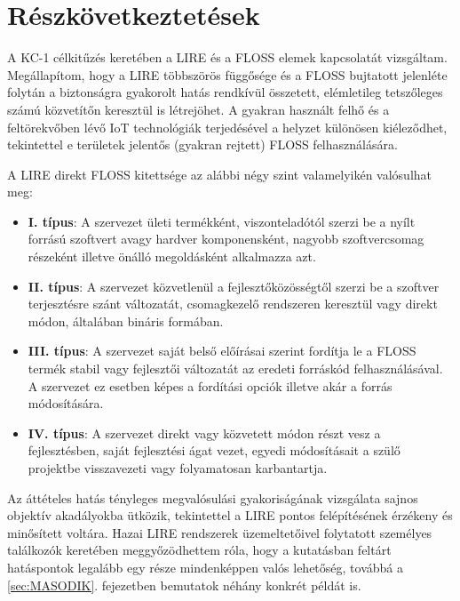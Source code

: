 \documentclass[12pt,magyar,a4paper,oneside]{scrreprt}
\providecommand{\tightlist}{%
  \setlength{\itemsep}{0pt}\setlength{\parskip}{0pt}}
\begin{document}
\hypertarget{ruxe9szkuxf6vetkeztetuxe9sek}{%
\section{Részkövetkeztetések}\label{ruxe9szkuxf6vetkeztetuxe9sek}}

A KC-1 célkitűzés keretében a LIRE és a FLOSS elemek kapcsolatát
vizsgáltam. Megállapítom, hogy a LIRE többszörös függősége és a FLOSS
bujtatott jelenléte folytán a biztonságra gyakorolt hatás rendkívül
összetett, elémletileg tetszőleges számú közvetítőn keresztül is
létrejöhet. A gyakran használt felhő és a feltörekvőben lévő IoT
technológiák terjedésével a helyzet különösen kiéleződhet, tekintettel e
területek jelentős (gyakran rejtett) FLOSS felhasználására.

A LIRE direkt FLOSS kitettsége az alábbi négy szint valamelyikén
valósulhat meg:

\begin{itemize}
\tightlist
\item
  \textbf{I. típus}: A szervezet ületi termékként, viszonteladótól
  szerzi be a nyílt forrású szoftvert avagy hardver komponensként,
  nagyobb szoftvercsomag részeként illetve önálló megoldásként
  alkalmazza azt.
\item
  \textbf{II. típus}: A szervezet közvetlenül a fejlesztőközösségtől
  szerzi be a szoftver terjesztésre szánt változatát, csomagkezelő
  rendszeren keresztül vagy direkt módon, általában bináris formában.
\item
  \textbf{III. típus}: A szervezet saját belső előírásai szerint
  fordítja le a FLOSS termék stabil vagy fejlesztői változatát az
  eredeti forráskód felhasználásával. A szervezet ez esetben képes a
  fordítási opciók illetve akár a forrás módosítására.
\item
  \textbf{IV. típus}: A szervezet direkt vagy közvetett módon részt vesz
  a fejlesztésben, saját fejlesztési ágat vezet, egyedi módosításait a
  szülő projektbe visszavezeti vagy folyamatosan karbantartja.
\end{itemize}

Az áttételes hatás tényleges megvalósulási gyakoriságának vizsgálata
sajnos objektív akadályokba ütközik, tekintettel a LIRE pontos
felépítésének érzékeny és minősített voltára. Hazai LIRE rendszerek
üzemeltetőivel folytatott személyes találkozók keretében meggyőzödhettem
róla, hogy a kutatásban feltárt hatáspontok legalább egy része
mindenképpen valós lehetőség, továbbá a \ref{sec:MASODIK}. fejezetben
bemutatok néhány konkrét példát is.
\end{document}
